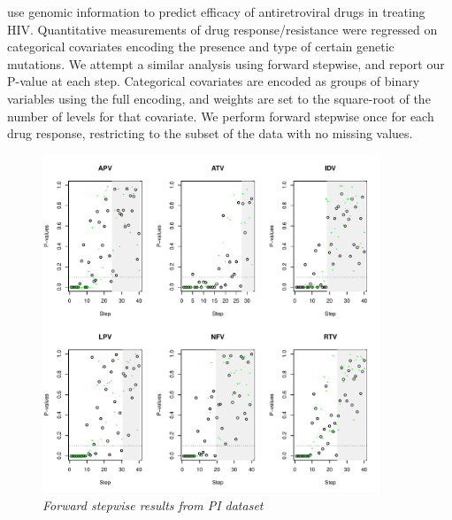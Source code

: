 \documentclass{imsart}
\begin{document}
\cite{HIV} use genomic information to predict efficacy of antiretroviral
drugs in treating HIV. Quantitative measurements of drug
response/resistance were regressed on categorical covariates encoding
the presence and type of certain genetic mutations. We attempt a similar
analysis using forward stepwise, and report our P-value at each step.
Categorical covariates are encoded as groups of binary variables using
the full encoding, and weights are set to the square-root of the
number of levels for that covariate. We perform forward stepwise once
for each drug response, restricting to the subset of the data with
no missing values.

\begin{figure}
\begin{center}
\includegraphics[width=0.9\textwidth]{../figs/HIV_PI.pdf}
\caption{\small \it Forward stepwise results from PI dataset}
\label{fig:HIVPI}
\end{center}
\end{figure}
\end{document}
